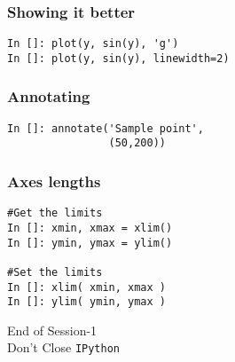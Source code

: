\documentclass[14pt,compress]{beamer}
\newcommand{\typ}[1]{\lstinline{#1}}
\begin{document}
\begin{frame}[fragile]
\frametitle{Showing it better}
\begin{lstlisting}
In []: plot(y, sin(y), 'g')
In []: plot(y, sin(y), linewidth=2)  
\end{lstlisting}
\end{frame}

\begin{frame}[fragile]
\frametitle{Annotating}
\begin{lstlisting}
In []: annotate('Sample point',
                (50,200))
\end{lstlisting}
\end{frame}

\begin{frame}[fragile]
\frametitle{Axes lengths}
  \begin{lstlisting}
#Get the limits
In []: xmin, xmax = xlim() 
In []: ymin, ymax = ylim() 

#Set the limits
In []: xlim( xmin, xmax ) 
In []: ylim( ymin, ymax ) 
  \end{lstlisting}
\end{frame}

\begin{frame}[fragile]
  \begin{center}
  End of Session-1\\
  \alert{Don't Close \typ{IPython}}
  \end{center}
\end{frame}
\end{document}
